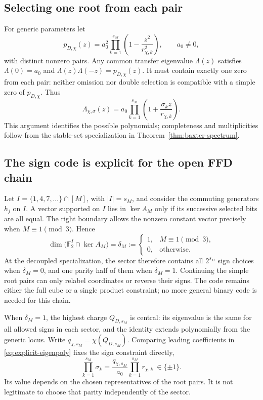 \documentclass[10pt,letterpaper]{article}
\newcommand{\FF}{\mathbb F_2}
\begin{document}
\subsection{Selecting one root from each pair}
For generic parameters let
\begin{equation}\label{eq:rootpairfactor}
 p_{D,\chi}(z)=a_0^2\prod_{k=1}^{s_M}\left(1-\frac{z^2}{r_{\chi,k}^2}\right),
 \qquad a_0\ne0,
\end{equation}
with distinct nonzero pairs. Any common transfer eigenvalue $\Lambda(z)$ satisfies $\Lambda(0)=a_0$ and $\Lambda(z)\Lambda(-z)=p_{D,\chi}(z)$. It must contain exactly one zero from each pair: neither omission nor double selection is compatible with a simple zero of $p_{D,\chi}$. Thus
\begin{equation}\label{eq:explicit-eigenpoly}
 \Lambda_{\chi,\sigma}(z)=a_0\prod_{k=1}^{s_M}
 \left(1+\frac{\sigma_k z}{r_{\chi,k}}\right).
\end{equation}
This argument identifies the possible polynomials; completeness and multiplicities follow from the stable-set specialization in Theorem~\ref{thm:baxter-spectrum}.

\subsection{The sign code is explicit for the open FFD chain}
Let $I=\{1,4,7,\ldots\}\cap[M]$, with $|I|=s_M$, and consider the commuting generators $h_j$ on $I$. A vector supported on $I$ lies in $\ker A_M$ only if its successive selected bits are all equal. The right boundary allows the nonzero constant vector precisely when $M\equiv1\pmod3$. Hence
\begin{equation}\label{eq:code-dimension}
 \dim\bigl(\FF^I\cap\ker A_M\bigr)=
 \delta_M:=\begin{cases}1,&M\equiv1\pmod3,\\0,&\text{otherwise}.\end{cases}
\end{equation}
At the decoupled specialization, the sector therefore contains all $2^{s_M}$ sign choices when $\delta_M=0$, and one parity half of them when $\delta_M=1$. Continuing the simple root pairs can only relabel coordinates or reverse their signs. The code remains either the full cube or a single product constraint; no more general binary code is needed for this chain.

When $\delta_M=1$, the highest charge $Q_{D,s_M}$ is central: its eigenvalue is the same for all allowed signs in each sector, and the identity extends polynomially from the generic locus. Write $q_{\chi,s_M}=\chi(Q_{D,s_M})$. Comparing leading coefficients in \eqref{eq:explicit-eigenpoly} fixes the sign constraint directly,
\begin{equation}\label{eq:parityconstraint}
 \boxed{\prod_{k=1}^{s_M}\sigma_k=
 \frac{q_{\chi,s_M}}{a_0}\prod_{k=1}^{s_M}r_{\chi,k}\ \in\{\pm1\}.}
\end{equation}
Its value depends on the chosen representatives of the root pairs. It is not legitimate to choose that parity independently of the sector.
\end{document}
